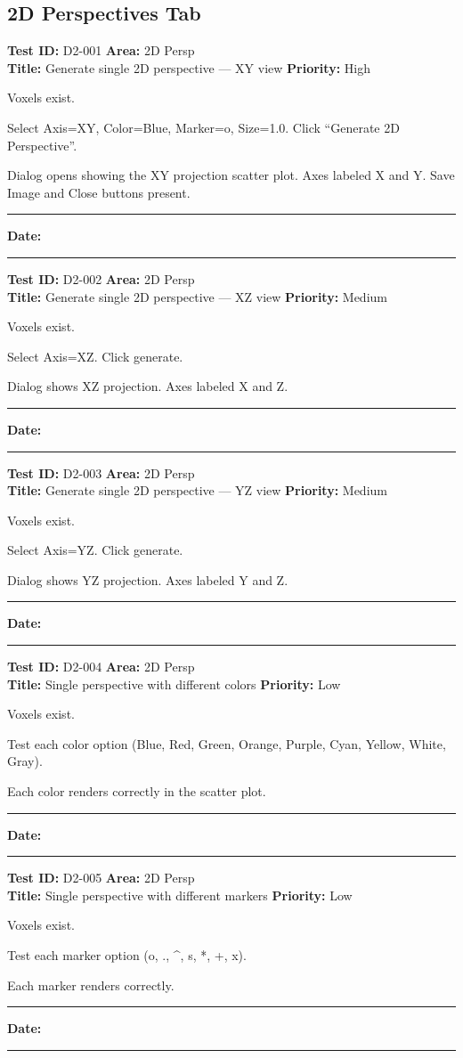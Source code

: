 \documentclass[12pt,a4paper]{article}
\newenvironment{testcase}[4]{%
  \smallskip
  \noindent\textbf{Test ID:} #1 \hfill \textbf{Area:} #2 \\
  \textbf{Title:} #3 \hfill \textbf{Priority:} #4
  \begin{description}[leftmargin=2em,style=nextline]
    \item[\textbf{Preconditions:}]
}{%
    \item[\textbf{Steps:}]
    \item[\textbf{Expected Result:}]
    \item[\textbf{Status:}] \rule{3cm}{0.4pt} \hspace{1em} \textbf{Date:} \rule{3cm}{0.4pt}
    \item[\textbf{Notes:}]
  \end{description}
  \smallskip
}
\begin{document}
\subsection{2D Perspectives Tab}

\begin{testcase}{D2-001}{2D Persp}{Generate single 2D perspective --- XY view}{High}
  \item Voxels exist.
  \item Select Axis=XY, Color=Blue, Marker=o, Size=1.0. Click ``Generate 2D Perspective''.
  \item Dialog opens showing the XY projection scatter plot. Axes labeled X and Y. Save Image and Close buttons present.
\end{testcase}

\begin{testcase}{D2-002}{2D Persp}{Generate single 2D perspective --- XZ view}{Medium}
  \item Voxels exist.
  \item Select Axis=XZ. Click generate.
  \item Dialog shows XZ projection. Axes labeled X and Z.
\end{testcase}

\begin{testcase}{D2-003}{2D Persp}{Generate single 2D perspective --- YZ view}{Medium}
  \item Voxels exist.
  \item Select Axis=YZ. Click generate.
  \item Dialog shows YZ projection. Axes labeled Y and Z.
\end{testcase}

\begin{testcase}{D2-004}{2D Persp}{Single perspective with different colors}{Low}
  \item Voxels exist.
  \item Test each color option (Blue, Red, Green, Orange, Purple, Cyan, Yellow, White, Gray).
  \item Each color renders correctly in the scatter plot.
\end{testcase}

\begin{testcase}{D2-005}{2D Persp}{Single perspective with different markers}{Low}
  \item Voxels exist.
  \item Test each marker option (o, ., \^{}, s, *, +, x).
  \item Each marker renders correctly.
\end{testcase}
\end{document}

